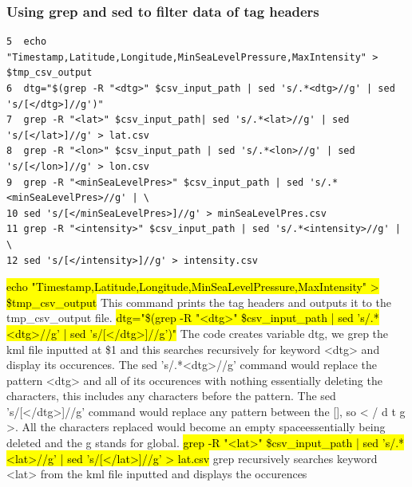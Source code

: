 \documentclass[]{article}
\begin{document}
\subsubsection{Using grep and sed to filter data of tag headers}
\begin{tcolorbox}[colback=white, colframe=black, boxrule=1pt, 
    title=Using grep and sed to filter data of tag headers, width=6.7in, fonttitle=\bfseries, listing only, listing options={language=sh, basicstyle=\ttfamily}]
\begin{verbatim}
5  echo "Timestamp,Latitude,Longitude,MinSeaLevelPressure,MaxIntensity" > $tmp_csv_output
6  dtg="$(grep -R "<dtg>" $csv_input_path | sed 's/.*<dtg>//g' | sed 's/[</dtg>]//g')"
7  grep -R "<lat>" $csv_input_path| sed 's/.*<lat>//g' | sed 's/[</lat>]//g' > lat.csv
8  grep -R "<lon>" $csv_input_path | sed 's/.*<lon>//g' | sed 's/[</lon>]//g' > lon.csv
9  grep -R "<minSeaLevelPres>" $csv_input_path | sed 's/.*<minSeaLevelPres>//g' | \
10 sed 's/[</minSeaLevelPres>]//g' > minSeaLevelPres.csv
11 grep -R "<intensity>" $csv_input_path | sed 's/.*<intensity>//g' | \ 
12 sed 's/[</intensity>]//g' > intensity.csv
\end{verbatim}
\hl{echo "Timestamp,Latitude,Longitude,MinSeaLevelPressure,MaxIntensity" > \$tmp\_csv\_output}\newline
This command prints the tag headers and outputs it to the tmp\_csv\_output file.\newline
\hl{dtg="\$(grep -R "<dtg>" \$csv\_input\_path | sed 's/.*<dtg>//g' | sed 's/[</dtg>]//g')"}\newline
The code creates variable dtg, we grep the kml file inputted at \$1 and this searches recursively\newline
for keyword <dtg> and display its occurences. The sed 's/.*<dtg>//g' command would replace the\newline
pattern <dtg> and all of its occurences with nothing essentially deleting the characters,\newline
this includes any characters before the pattern. The sed 's/[</dtg>]//g' command would replace\newline
any pattern between the [], so < / d t g >. All the characters replaced would become an\newline
empty spaceessentially being deleted and the g stands for global.\newline
\hl{grep -R "<lat>" \$csv\_input\_path | sed 's/.*<lat>//g' | sed 's/[</lat>]//g' > lat.csv}\newline
grep recursively searches keyword <lat> from the kml file inputted and displays the occurences\newline

\end{tcolorbox}
\end{document}
